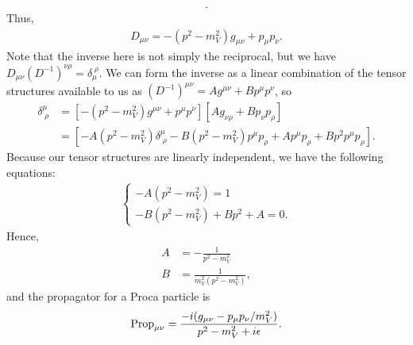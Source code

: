 {\begin{align}
.\end{align}
Thus,
\begin{align}
    D_{\mu\nu} = - ( p^2 - m_{V}^2 ) g_{\mu\nu} + p_{\mu} p_{\nu}
.\end{align}
Note that the inverse here is not simply the reciprocal, but we have $D_{\mu\nu} (D^{-1})^{\nu\rho} = \delta_{\mu}^{\;\rho}$.
We can form the inverse as a linear combination of the tensor structures available to us as $(D^{-1})^{\mu\nu} = A g^{\mu\nu} + B p^{\mu} p^{\nu}$, so
\begin{align}
    \delta^{\mu}_{\;\rho} &= [ -(p^2 - m_{V}^2) g^{\mu\nu} + p^{\mu} p^{\nu} ] [ A g_{\nu\rho} + B p_{\nu} p_{\rho} ] \nonumber \\
                          &= [ -A (p^2 - m_{V}^2) \delta^{\mu}_{\;\rho} - B (p^2 - m_{V}^2) p^{\mu} p_{\rho} + A p^{\mu} p_{\rho} + B p^2 p^{\mu} p_{\rho} ]
.\end{align}
Because our tensor structures are linearly independent, we have the following equations:
\begin{align}
\begin{cases} 
    -A (p^2 - m_{V}^2) = 1 \\
    -B (p^2 - m_{V}^2) + B p^2 + A = 0
.\end{cases}
\end{align}
Hence,
\begin{align}
    A &= -\frac{1}{p^2 - m_{V}^2} \\
    B &= \frac{1}{m_{V}^2( p^2 - m_{V}^2 )}
,\end{align}
and the propagator for a Proca particle is
\begin{align}
    {\rm Prop}_{\mu\nu} = \frac{-i ( g_{\mu\nu} - p_{\mu} p_{\nu} / m_{V}^2 )}{p^2 - m_{V}^2 + i \epsilon}
.\end{align}

}
